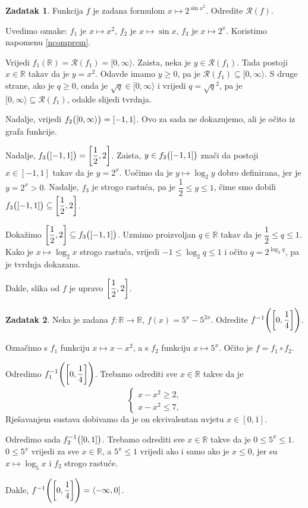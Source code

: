 \documentclass{book}
\let\originalleft\left
\let\originalright\right
\renewcommand{\left}{\mathopen{}\mathclose\bgroup\originalleft}
\renewcommand{\right}{\aftergroup\egroup\originalright}
\renewenvironment{proof}{%
    \vspace{-\parskip}\begin{oldproof}%
    }{%
    \end{oldproof}%
}
\theoremstyle{definition}
\theoremstyle{definition}
\newtheorem{exercise}{Zadatak}
\theoremstyle{remark}
\begin{document}
\begin{exercise}
\label{excompim1}
Funkcija $f$ je zadana formulom $x\mapsto 2^{\sin{x^2}}$. Odredite $\mathcal{R}(f)$.
\end{exercise}
\begin{proof}[Rješenje]
Uvedimo oznake: $f_1$ je $x\mapsto x^2$, $f_2$ je $x\mapsto \sin{x}$, $f_3$ je $x\mapsto 2^x$. Koristimo napomenu \ref{ncomprem}. 

Vrijedi $f_1(\mathbb{R})=\mathcal{R}(f_1)=[0, \infty\rangle$. Zaista, neka je $y\in \mathcal{R}(f_1)$. Tada postoji $x\in \mathbb{R}$ takav da je $y=x^2$. Odavde imamo $y\geq 0$, pa je $\mathcal{R}(f_1)\subseteq [0, \infty\rangle$. S druge strane, ako je $q\geq 0$, onda je $\sqrt{q}\in [0, \infty\rangle$ i vrijedi $q=\sqrt{q}^2$, pa je $[0, \infty\rangle\subseteq \mathcal{R}(f_1)$, odakle slijedi tvrdnja.

Nadalje, vrijedi $f_2\left([0, \infty\rangle\right)=[-1, 1]$. Ovo za sada ne dokazujemo, ali je očito iz grafa funkcije. 

Nadalje, $f_3\left([-1, 1]\right)=\left[\dfrac{1}{2}, 2\right]$. Zaista, $y\in f_3\left([-1, 1]\right)$ znači da postoji $x\in [-1, 1]$ takav da je $y=2^x$. Uočimo da je $y\mapsto \log_2{y}$ dobro definirana, jer je $y=2^x>0$. Nadalje, $f_3$ je strogo rastuća, pa je $\dfrac{1}{2}\leq y\leq 1$, čime smo dobili $f_3\left([-1, 1]\right)\subseteq \left[\dfrac{1}{2}, 2\right]$. 

Dokažimo $\left[\dfrac{1}{2}, 2\right]\subseteq f_3\left([-1, 1]\right)$. Uzmimo proizvoljan $q\in \mathbb{R}$ takav da je $\dfrac{1}{2}\leq q\leq 1$. Kako je $x\mapsto \log_2{x}$ strogo rastuća, vrijedi $-1\leq \log_2{q}\leq 1$ i očito $q=2^{\log_2{q}}$, pa je tvrdnja dokazana.

Dakle, slika od $f$ je upravo $\left[\dfrac{1}{2}, 2\right]$.
\end{proof}
\begin{exercise}
Neka je zadana $f : \mathbb{R}\to \mathbb{R}$, $f(x)=5^x-5^{2x}$. Odredite $f^{-1}\left(\left[0, \dfrac{1}{4}\right]\right)$.
\end{exercise}
\begin{proof}[Rješenje]
Označimo s $f_1$ funkciju $x\mapsto x-x^2$, a s $f_2$ funkciju $x\mapsto 5^x$. Očito je $f=f_1\circ f_2$.

Odredimo $f_1^{-1}\left(\left[0, \dfrac{1}{4}\right]\right)$. Trebamo odrediti sve $x\in \mathbb{R}$ takve da je
$$\begin{cases}
x-x^2\geq 2,\\
x-x^2\leq 7,
\end{cases}$$
Rješavanjem sustava dobivamo da je on ekvivalentan uvjetu $x\in [0, 1]$.

Odredimo sada $f_2^{-1}\left([0, 1]\right)$. Trebamo odrediti sve $x\in \mathbb{R}$ takve da je $0\leq 5^x\leq 1$. $0\leq 5^x$ vrijedi za sve $x\in \mathbb{R}$, a $5^x\leq 1$ vrijedi ako i samo ako je $x\leq 0$, jer su $x\mapsto \log_5{x}$ i $f_2$ strogo rastuće. 

Dakle, $f^{-1}\left(\left[0, \dfrac{1}{4}\right]\right)=\langle-\infty, 0]$.
\end{proof}
\end{document}
